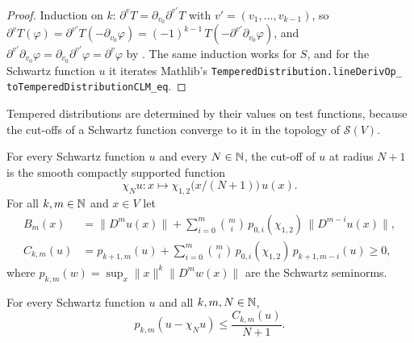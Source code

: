 \begin{proof}
\leanok
Induction on $k$: $\partial^v T = \partial_{v_0} \partial^{v'} T$ with
$v' = (v_1, \dots, v_{k-1})$, so
$\partial^v T(\varphi) = \partial^{v'} T(-\partial_{v_0} \varphi)
= (-1)^{k-1} \, T(-\partial^{v'} \partial_{v_0} \varphi)$, and
$\partial^{v'} \partial_{v_0} \varphi = \partial_{v_0} \partial^{v'} \varphi = \partial^v \varphi$
by . The same induction works for $S$, and for the
Schwartz function $u$ it iterates Mathlib's
\texttt{TemperedDistribution.\allowbreak lineDerivOp\_\allowbreak
toTemperedDistributionCLM\_\allowbreak eq}.
\end{proof}

Tempered distributions are determined by their values on test functions, because the cut-offs
of a Schwartz function converge to it in the topology of $\mathcal S(V)$.

\begin{definition}
\label{def:schwartz-cutoff}
\leanok
{}
For every Schwartz function $u$ and every $N \in \mathbb{N}$, the cut-off of $u$ at radius $N + 1$ is the
smooth compactly supported function
\[
  \chi_N u : x \mapsto \chi_{1,2}\bigl(x / (N + 1)\bigr) \, u(x) .
\]
For all $k, m \in \mathbb{N}$ and $x \in V$ let
\begin{align*}
  B_m(x) &= \|D^m u(x)\| + \sum_{i=0}^m \binom{m}{i} \, p_{0,i}(\chi_{1,2}) \,
  \|D^{m-i} u(x)\|, \\
  C_{k,m}(u) &= p_{k+1,m}(u) + \sum_{i=0}^m \binom{m}{i} \, p_{0,i}(\chi_{1,2}) \,
  p_{k+1,m-i}(u) \geq 0,
\end{align*}
where $p_{k,m}(w) = \sup_x \|x\|^k \|D^m w(x)\|$ are the Schwartz seminorms.
\end{definition}

\begin{lemma}
\label{lem:schwartz-cutoff-estimate}
\leanok
{}
For every Schwartz function $u$ and all $k, m, N \in \mathbb{N}$,
\[
  p_{k,m}(u - \chi_N u) \leq \frac{C_{k,m}(u)}{N + 1} .
\]
\end{lemma}


